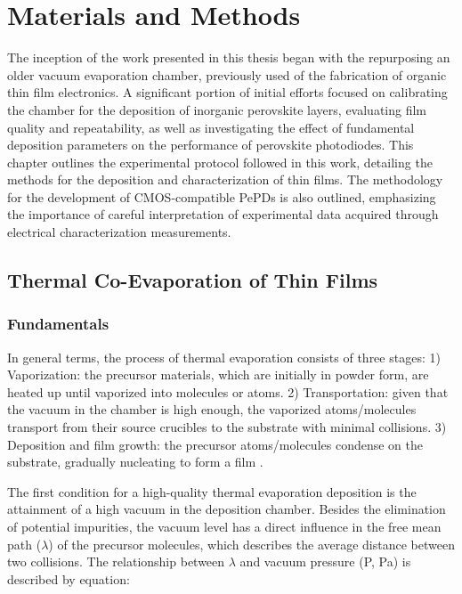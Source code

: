 \chapter{Materials and Methods}\label{ch:material_properties}

The inception of the work presented in this thesis began with the repurposing an older vacuum evaporation chamber, previously used of the fabrication of organic thin film electronics. A significant portion of initial efforts focused on calibrating the chamber for the deposition of inorganic perovskite layers, evaluating film quality and repeatability, as well as investigating the effect of fundamental deposition parameters on the performance of perovskite photodiodes. This chapter outlines the experimental protocol followed in this work, detailing the methods for the deposition and characterization of  thin films. The methodology for the development of CMOS-compatible PePDs is also outlined, emphasizing the importance of careful interpretation of experimental data acquired through electrical characterization measurements.  


\section{Thermal Co-Evaporation of  Thin Films}

\subsection{Fundamentals} \label{sec:materials_methods:fundamentals}

In general terms, the process of thermal evaporation consists of three stages: 1) Vaporization: the precursor materials, which are initially in powder form, are heated up until vaporized into molecules or atoms. 2) Transportation: given that the vacuum in the chamber is high enough, the vaporized atoms/molecules transport from their source crucibles to the substrate with minimal collisions. 3) Deposition and film growth: the precursor atoms/molecules condense on the substrate, gradually nucleating to form a film \cite{Du2022ThermalOutlook}. 

The first condition for a high-quality thermal evaporation deposition is the attainment of a high vacuum in the deposition chamber. Besides the elimination of potential impurities, the vacuum level has a direct influence in the free mean path ($\lambda$) of the precursor molecules, which describes the average distance between two collisions. The relationship between $\lambda$ and vacuum pressure (P, Pa) is described by equation:

